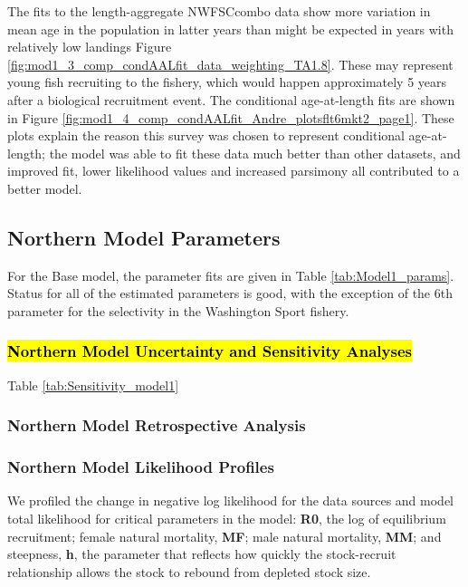 \documentclass[12pt,]{article}
\begin{document}
The fits to the length-aggregate NWFSCcombo data show more variation in
mean age in the population in latter years than might be expected in
years with relatively low landings Figure
\ref{fig:mod1_3_comp_condAALfit_data_weighting_TA1.8}. These may
represent young fish recruiting to the fishery, which would happen
approximately 5 years after a biological recruitment event. The
conditional age-at-length fits are shown in Figure
\ref{fig:mod1_4_comp_condAALfit_Andre_plotsflt6mkt2_page1}. These plots
explain the reason this survey was chosen to represent conditional
age-at-length; the model was able to fit these data much better than
other datasets, and improved fit, lower likelihood values and increased
parsimony all contributed to a better model.

\subsection{Northern Model Parameters}\label{northern-model-parameters}

For the Base model, the parameter fits are given in Table
\ref{tab:Model1_params}. Status for all of the estimated parameters is
good, with the exception of the 6th parameter for the selectivity in the
Washington Sport fishery.

\subsubsection{\texorpdfstring{\hl{Northern Model Uncertainty and Sensitivity Analyses}}{}}\label{section}

Table \ref{tab:Sensitivity_model1}

\subsubsection{Northern Model Retrospective
Analysis}\label{northern-model-retrospective-analysis}

\subsubsection{Northern Model Likelihood
Profiles}\label{northern-model-likelihood-profiles}

We profiled the change in negative log likelihood for the data sources
and model total likelihood for critical parameters in the model:
\textbf{R0}, the log of equilibrium recruitment; female natural
mortality, \textbf{MF}; male natural mortality, \textbf{MM}; and
steepness, \textbf{h}, the parameter that reflects how quickly the
stock-recruit relationship allows the stock to rebound from depleted
stock size.
\end{document}
